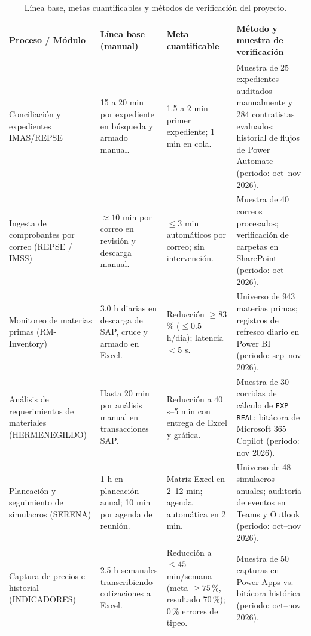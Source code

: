 \begin{table}[H]
  \centering
  \caption{Línea base, metas cuantificables y métodos de verificación del proyecto.}
  \label{tab:criterios_exito}
  \small
  \begin{tabular}{@{}p{3.0cm}p{2.8cm}p{3.0cm}p{3.6cm}@{}}
    \toprule
    \textbf{Proceso / Módulo} & \textbf{Línea base (manual)} & \textbf{Meta cuantificable} & \textbf{Método y muestra de verificación} \\
    \midrule
    Conciliación y expedientes IMAS/REPSE & 15 a 20 min por expediente en búsqueda y armado manual. & 1.5 a 2 min primer expediente; 1 min en cola. & Muestra de 25 expedientes auditados manualmente y 284 contratistas evaluados; historial de flujos de Power Automate (periodo: oct--nov 2026). \\
    \addlinespace
    Ingesta de comprobantes por correo (REPSE / IMSS) & $\approx 10$ min por correo en revisión y descarga manual. & $\le 3$ min automáticos por correo; sin intervención. & Muestra de 40 correos procesados; verificación de carpetas en SharePoint (periodo: oct 2026). \\
    \addlinespace
    Monitoreo de materias primas (RM-Inventory) & 3.0 h diarias en descarga de SAP, cruce y armado en Excel. & Reducción $\ge 83$\,\% ($\le 0.5$ h/día); latencia $< 5$ s. & Universo de 943 materias primas; registros de refresco diario en Power BI (periodo: sep--nov 2026). \\
    \addlinespace
    Análisis de requerimientos de materiales (HERMENEGILDO) & Hasta 20 min por análisis manual en transacciones SAP. & Reducción a 40 s--5 min con entrega de Excel y gráfica. & Muestra de 30 corridas de cálculo de \texttt{EXP REAL}; bitácora de Microsoft 365 Copilot (periodo: nov 2026). \\
    \addlinespace
    Planeación y seguimiento de simulacros (SERENA) & 1 h en planeación anual; 10 min por agenda de reunión. & Matriz Excel en 2--12 min; agenda automática en 2 min. & Universo de 48 simulacros anuales; auditoría de eventos en Teams y Outlook (periodo: oct--nov 2026). \\
    \addlinespace
    Captura de precios e historial (INDICADORES) & 2.5 h semanales transcribiendo cotizaciones a Excel. & Reducción a $\le 45$ min/semana (meta $\ge 75$\,\%, resultado 70\,\%); 0\,\% errores de tipeo. & Muestra de 50 capturas en Power Apps vs. bitácora histórica (periodo: oct--nov 2026). \\
    \bottomrule
  \end{tabular}
\end{table}


